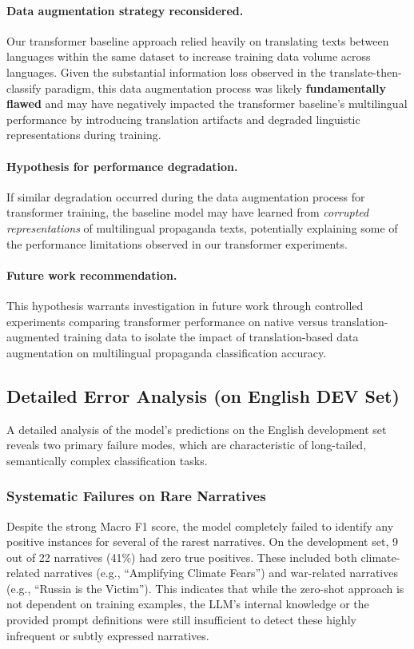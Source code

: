 \paragraph{Data augmentation strategy reconsidered.} Our transformer baseline approach relied heavily on translating texts between languages within the same dataset to increase training data volume across languages. Given the substantial information loss observed in the translate-then-classify paradigm, this data augmentation process was likely \textbf{fundamentally flawed} and may have negatively impacted the transformer baseline's multilingual performance by introducing translation artifacts and degraded linguistic representations during training.

\paragraph{Hypothesis for performance degradation.} If similar degradation occurred during the data augmentation process for transformer training, the baseline model may have learned from \textit{corrupted representations} of multilingual propaganda texts, potentially explaining some of the performance limitations observed in our transformer experiments. 

\paragraph{Future work recommendation.} This hypothesis warrants investigation in future work through controlled experiments comparing transformer performance on native versus translation-augmented training data to isolate the impact of translation-based data augmentation on multilingual propaganda classification accuracy.

\subsection{Detailed Error Analysis (on English DEV Set)}

A detailed analysis of the model's predictions on the English development set reveals two primary failure modes, which are characteristic of long-tailed, semantically complex classification tasks.

\subsubsection{Systematic Failures on Rare Narratives}

Despite the strong Macro F1 score, the model completely failed to identify any positive instances for several of the rarest narratives. On the development set, 9 out of 22 narratives (41\%) had zero true positives. These included both climate-related narratives (e.g., ``Amplifying Climate Fears'') and war-related narratives (e.g., ``Russia is the Victim''). This indicates that while the zero-shot approach is not dependent on training examples, the LLM's internal knowledge or the provided prompt definitions were still insufficient to detect these highly infrequent or subtly expressed narratives.

